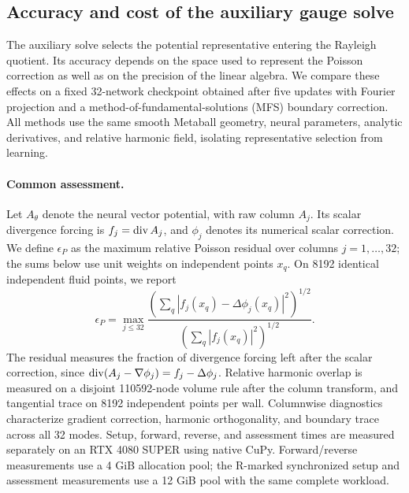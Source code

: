 \subsection{Accuracy and cost of the auxiliary gauge solve}
\label{app:gauge-solvers}

The auxiliary solve selects the potential representative entering the Rayleigh quotient. Its accuracy depends on the space used to represent the Poisson correction as well as on the precision of the linear algebra. We compare these effects on a fixed 32-network checkpoint obtained after five updates with Fourier projection and a method-of-fundamental-solutions (MFS) boundary correction. All methods use the same smooth Metaball geometry, neural parameters, analytic derivatives, and relative harmonic field, isolating representative selection from learning.

\paragraph{Common assessment.}
Let $A_\theta$ denote the neural vector potential, with raw column $A_j$. Its scalar divergence forcing is $f_j=\operatorname{div} A_j$, and $\phi_j$ denotes its numerical scalar correction. We define $\epsilon_P$ as the maximum relative Poisson residual over columns $j=1,\ldots,32$; the sums below use unit weights on independent points $x_q$. On 8192 identical independent fluid points, we report
\begin{equation}
\epsilon_P=\max_{j\leq32}
\frac{\left(\sum_q|f_j(x_q)-\Delta\phi_j(x_q)|^2\right)^{1/2}}
{\left(\sum_q|f_j(x_q)|^2\right)^{1/2}}.
\label{eq:gauge-solver-residual}
\end{equation}
The residual measures the fraction of divergence forcing left after the scalar correction, since $\operatorname{div}(A_j-\nabla\phi_j)=f_j-\Delta\phi_j$. Relative harmonic overlap is measured on a disjoint 110592-node volume rule after the column transform, and tangential trace on 8192 independent points per wall. Columnwise diagnostics characterize gradient correction, harmonic orthogonality, and boundary trace across all 32 modes. Setup, forward, reverse, and assessment times are measured separately on an RTX 4080 SUPER using native CuPy. Forward/reverse measurements use a 4 GiB allocation pool; the R-marked synchronized setup and assessment measurements use a 12 GiB pool with the same complete workload.

